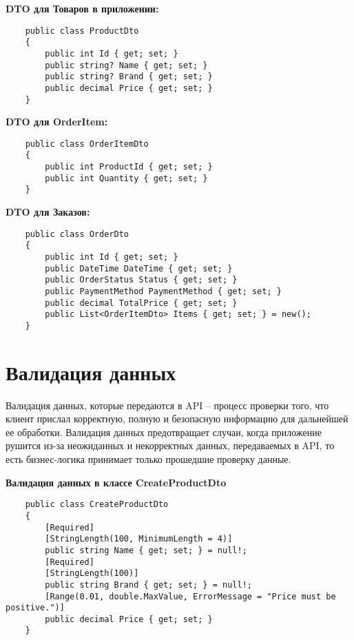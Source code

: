 \documentclass[a4paper,12pt]{report}
\begin{document}
\textbf{\acs{DTO} для Товаров в приложении:}

\begin{verbatim}
    public class ProductDto
    {
        public int Id { get; set; } 
        public string? Name { get; set; }
        public string? Brand { get; set; }
        public decimal Price { get; set; }
    }
\end{verbatim}

\textbf{\acs{DTO} для OrderItem:}

\begin{verbatim}
    public class OrderItemDto
    {
        public int ProductId { get; set; }
        public int Quantity { get; set; }
    }
\end{verbatim}

\textbf{\acs{DTO} для Заказов:}

\begin{verbatim}
    public class OrderDto
    {
        public int Id { get; set; }
        public DateTime DateTime { get; set; }
        public OrderStatus Status { get; set; }
        public PaymentMethod PaymentMethod { get; set; }
        public decimal TotalPrice { get; set; }
        public List<OrderItemDto> Items { get; set; } = new();
    }
\end{verbatim}

\section{Валидация данных}

Валидация данных, которые передаются в \acs{API} -- процесс проверки того, что клиент прислал корректную, полную и безопасную информацию для дальнейшей ее обработки. 
Валидация данных предотвращает случаи, когда приложение рушится из-за неожиданных и некорректных данных, передаваемых в \acs{API}, то есть бизнес-логика принимает 
только прошедшие проверку данные.

\textbf{Валидация данных в классе CreateProductDto}
\begin{verbatim}
    public class CreateProductDto
    {
        [Required]
        [StringLength(100, MinimumLength = 4)]
        public string Name { get; set; } = null!;
        [Required]
        [StringLength(100)]
        public string Brand { get; set; } = null!;
        [Range(0.01, double.MaxValue, ErrorMessage = "Price must be positive.")]
        public decimal Price { get; set; }
    }
\end{verbatim}
\end{document}
